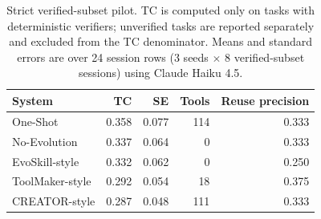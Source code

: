 \begin{table}[t]
\centering
\small
\caption{Strict verified-subset pilot. TC is computed only on tasks with deterministic verifiers; unverified tasks are reported separately and excluded from the TC denominator. Means and standard errors are over 24 session rows (3 seeds $\times$ 8 verified-subset sessions) using Claude Haiku 4.5.}
\label{tab:strict-results}
\begin{tabular}{lrrrr}
\toprule
\textbf{System} & \textbf{TC} & \textbf{SE} & \textbf{Tools} & \textbf{Reuse precision} \\
\midrule
One-Shot & 0.358 & 0.077 & 114 & 0.333 \\
No-Evolution & 0.337 & 0.064 & 0 & 0.333 \\
EvoSkill-style & 0.332 & 0.062 & 0 & 0.250 \\
ToolMaker-style & 0.292 & 0.054 & 18 & 0.375 \\
CREATOR-style & 0.287 & 0.048 & 111 & 0.333 \\
\bottomrule
\end{tabular}
\end{table}
